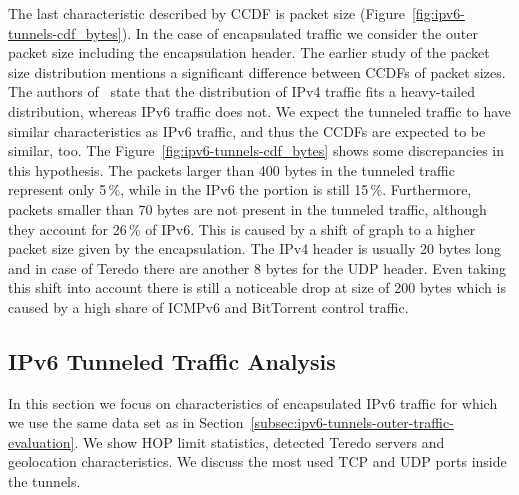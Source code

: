 The last characteristic described by CCDF is packet size (Figure~\ref{fig:ipv6-tunnels-cdf_bytes}). In the case of encapsulated traffic we consider the outer packet size including the encapsulation header. The earlier study of the packet size distribution mentions a significant difference between CCDFs of packet sizes. The authors of~\cite{Ciflikli-2012-Packet} state that the distribution of IPv4 traffic fits a heavy-tailed distribution, whereas IPv6 traffic does not. We expect the tunneled traffic to have similar characteristics as IPv6 traffic, and thus the CCDFs are expected to be similar, too. The Figure~\ref{fig:ipv6-tunnels-cdf_bytes} shows some discrepancies in this hypothesis. The packets larger than 400 bytes in the tunneled traffic represent only 5\,\%, while in the IPv6 the portion is still 15\,\%. Furthermore, packets smaller than 70 bytes are not present in the tunneled traffic, although they account for 26\,\% of IPv6. This is caused by a shift of graph to a higher packet size given by the encapsulation. The IPv4 header is usually 20 bytes long and in case of Teredo there are another 8 bytes for the UDP header. Even taking this shift into account there is still a noticeable drop at size of 200 bytes which is caused by a high share of ICMPv6 and BitTorrent control traffic.


\subsection{IPv6 Tunneled Traffic Analysis} \label{subsec:ipv6-tunnels-inner-traffic-evaluation}

In this section we focus on characteristics of encapsulated IPv6 traffic for which we use the same data set as in Section~\ref{subsec:ipv6-tunnels-outer-traffic-evaluation}. We show HOP limit statistics, detected Teredo servers and geolocation characteristics. We discuss the most used TCP and UDP ports inside the tunnels.

